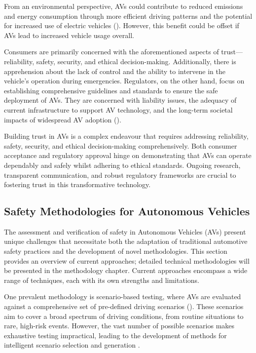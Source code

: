 From an environmental perspective, AVs could contribute to reduced emissions and energy consumption through more efficient driving patterns and the potential for increased use of electric vehicles (\cite{Greenblatt2015}). However, this benefit could be offset if AVs lead to increased vehicle usage overall.

Consumers are primarily concerned with the aforementioned aspects of trust—reliability, safety, security, and ethical decision-making. Additionally, there is apprehension about the lack of control and the ability to intervene in the vehicle's operation during emergencies. Regulators, on the other hand, focus on establishing comprehensive guidelines and standards to ensure the safe deployment of AVs. They are concerned with liability issues, the adequacy of current infrastructure to support AV technology, and the long-term societal impacts of widespread AV adoption (\cite{litman2020}).

Building trust in AVs is a complex endeavour that requires addressing reliability, safety, security, and ethical decision-making comprehensively. Both consumer acceptance and regulatory approval hinge on demonstrating that AVs can operate dependably and safely whilst adhering to ethical standards. Ongoing research, transparent communication, and robust regulatory frameworks are crucial to fostering trust in this transformative technology.

\subsection{Safety Methodologies for Autonomous Vehicles}

The assessment and verification of safety in Autonomous Vehicles (AVs) present unique challenges that necessitate both the adaptation of traditional automotive safety practices and the development of novel methodologies. This section provides an overview of current approaches; detailed technical methodologies will be presented in the methodology chapter. Current approaches encompass a wide range of techniques, each with its own strengths and limitations.

One prevalent methodology is scenario-based testing, where AVs are evaluated against a comprehensive set of pre-defined driving scenarios (\cite{Feng2021}). These scenarios aim to cover a broad spectrum of driving conditions, from routine situations to rare, high-risk events. However, the vast number of possible scenarios makes exhaustive testing impractical, leading to the development of methods for intelligent scenario selection and generation \cite{Koren2018}.

